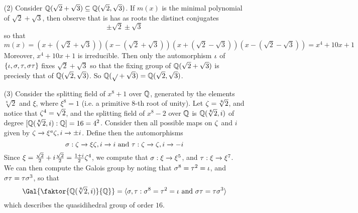 \begin{example}
\begin{enumerate}
        \item[(2)] Consider $\mathbb{Q}(\sqrt{2}+\sqrt{3}) \subseteq \mathbb{Q}(\sqrt{2},\sqrt{3})$.
            If $m(x)$ is the minimal polynomial of $\sqrt{2}+\sqrt{3}$, then
            observe that is has as roots the distinct conjugates
            \begin{equation*}
                \pm \sqrt{2} \pm \sqrt{{3}}
            \end{equation*}
            so that
            \begin{equation*}
                m(x)=(x+(\sqrt{2}+\sqrt{3}))(x-(\sqrt{2}+\sqrt{3}))
                        (x+(\sqrt{2}-\sqrt{3}))(x-(\sqrt{2}-\sqrt{3}))
                    =x^4+10x+1
            \end{equation*}
            Moreover, $x^4+10x+1$ is irreducible. Then only the automorphism
            $\iota$ of  $\{\iota, \sigma, \tau, \sigma\tau\}$ fixes $\sqrt{2}+\sqrt{{3}}$ so that
            the fixing group of $\mathbb{Q}(\sqrt{2}+\sqrt{3})$ is preciesly that of
            $\mathbb{Q}(\sqrt{2},\sqrt{3})$. So
            $\mathbb{Q}(\sqrt{}+\sqrt{3})=\mathbb{Q}(\sqrt{2},\sqrt{3})$.

        \item[(3)] Consider the splitting field of $x^8+1$ over  $\mathbb{Q}$, generated
            by the elements  $\sqrt[8]{2}$ and $\xi$, where  $\xi^8=1$  (i.e. a
            primitive $8$-th root of unity). Let $\zeta=\sqrt[8]{2}$, and notice
            that $\zeta^4=\sqrt{2}$, and the splitting field of $x^8-2$ over  $\mathbb{Q}$
            is  $\mathbb{Q}(\sqrt[8]{2},i)$ of degree $[\mathbb{Q}(\sqrt[8]{2},i):\mathbb{Q}]=16=4^2$.
            Consider then all possible maps on $\zeta$ and  $i$ given by $\zeta
            \xrightarrow{} \xi^a\zeta, i \xrightarrow{} \pm i$. Define then the
            automorphisms
            \begin{equation*}
                \sigma:\zeta \xrightarrow{} \xi\zeta,i \xrightarrow{} i
                \text{ and }
                \tau:\zeta \xrightarrow{} \zeta, i \xrightarrow{} -i
            \end{equation*}
            Since
            $\xi=\frac{\sqrt{2}}{2}+i\frac{\sqrt{2}}{2}=\frac{1+i}{2}\zeta^4$, we
            compute that $\sigma:\xi \xrightarrow{} \xi^5$, and $\tau:\xi
            \xrightarrow{} \xi^7$. We can then compute the Galois group by
            noting that $\sigma^8=\tau^2=\iota$, and  $\sigma\tau=\tau\sigma^3$, so that
            \begin{equation*}
                \Gal{\faktor{\Q(\sqrt[8]{2},i)}{\Q}}=
                \langle \s,\t : \s^8=\t^2=\i \text{ and } \s\t=\t\s^3 \rangle
            \end{equation*}
            which describes the quasidihedral group of order $16$.
    \end{enumerate}
\end{example}
